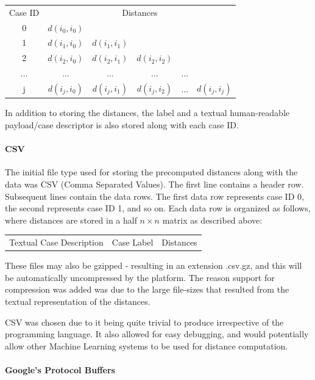 \documentclass[a4paper,11pt]{report}
\begin{document}
\medskip

\begin{tabular}{ c c c c c c }
	Case ID & \multicolumn{5}{c}{Distances} \\
	0 & $d(i_{0},i_{0})$ &  &  &  & \\
	1 & $d(i_{1},i_{0})$ & $d(i_{1},i_{1})$ &  &  &  \\
	2 & $d(i_{2},i_{0})$ & $d(i_{2},i_{1})$ & $d(i_{2},i_{2})$ &  & \\ 
	... & ... & ... & ... & ... & \\ 
	j & $d(i_{j},i_{0})$ & $d(i_{j},i_{1})$ & $d(i_{j},i_{2})$ & ... & $d(i_{j},i_{j})$ \\ 
\end{tabular}

\medskip

In addition to storing the distances, the label and a textual human-readable payload/case descriptor is also stored along with each case ID.

\paragraph{CSV}
The initial file type used for storing the precomputed distances along with the data was CSV (Comma Separated Values). The first line contains a header row. Subsequent lines contain the data rows. The first data row represents case ID 0, the second represents case ID 1, and so on. Each data row is organized as follows, where distances are stored in a half $n \times n$ matrix as described above:
\medskip

\begin{tabular}{ |c| |c| |c| }
	Textual Case Description & Case Label & Distances \\
\end{tabular}

\medskip

These files may also be gzipped - resulting in an extension .csv.gz, and this will be automatically uncompressed by the platform. The reason support for compression was added was due to the large file-sizes that resulted from the textual representation of the distances.

CSV was chosen due to it being quite trivial to produce irrespective of the programming language. It also allowed for easy debugging, and would potentially allow other Machine Learning systems to be used for distance computation.

\paragraph{Google's Protocol Buffers \citep{prog:protocolbuffers}}
\end{document}
